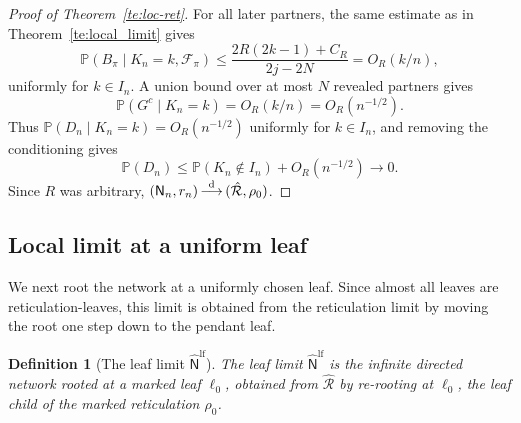\documentclass[english,11pt]{smfart}
\newcommand{\Prb}[1]{\mathbb{P}\left(#1\right)}
\newcommand{\convdis}{\,{\buildrel \mathrm{d} \over \longrightarrow}\,}
\newcommand{\cR}{\mathcal{R}}
\newcommand{\mN}{\mathsf{N}}
\newtheorem{definition}[theorem]{Definition}
\numberwithin{equation}{section}
\begin{document}
\begin{proof}[Proof of Theorem~\ref{te:loc-ret}]
\smallskip
For all later partners, the same estimate as in Theorem~\ref{te:local_limit}
gives
\[
  \Prb{B_\pi\mid K_n=k,\mathcal F_\pi}
  \le
  \frac{2R(2k-1)+C_R}{2j-2N}
  =
  O_R(k/n),
\]
uniformly for \(k\in I_n\). A union bound over at most \(N\) revealed
partners gives
\[
  \Prb{G^c\mid K_n=k}=O_R(k/n)=O_R(n^{-1/2}).
\]
Thus \(\Prb{D_n\mid K_n=k}=O_R(n^{-1/2})\) uniformly for \(k\in I_n\), and
removing the conditioning gives
\[
  \Prb{D_n}\le \Prb{K_n\notin I_n}+O_R(n^{-1/2})\to0.
\]
Since \(R\) was arbitrary, \((\mN_n,r_n)\convdis(\hat{\cR},\rho_0)\).
\end{proof}


\subsection{Local limit at a uniform leaf}\label{ssec:leaf}

We next root the network at a uniformly chosen leaf. Since almost all leaves are
reticulation-leaves, this limit is obtained from the reticulation limit by
moving the root one step down to the pendant leaf.

\begin{definition}[The leaf limit $\hat{\mN}^{\mathrm{lf}}$]\label{def:Lfhat}
The \emph{leaf limit} $\hat{\mN}^{\mathrm{lf}}$ is the infinite directed
network rooted at a marked leaf $\ell_0$, obtained from $\hat{\cR}$ by
re-rooting at $\ell_0$, the leaf child of the marked reticulation $\rho_0$.
\end{definition}
\end{document}
